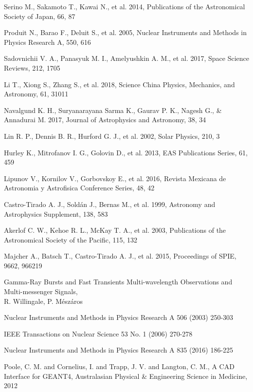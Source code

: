 \documentclass[12pt, a4paper,titlepage]{article}
\numberwithin{equation}{section}
\numberwithin{figure}{section}
\begin{document}
\begin{thebibliography}{99}
 Serino M., Sakamoto T., Kawai N., et al. 2014, Publications of the Astronomical Society of Japan, 66,
87

 Produit N., Barao F., Deluit S., et al. 2005, Nuclear Instruments and Methods in Physics Research A,
550, 616

 Sadovnichii V. A., Panasyuk M. I., Amelyushkin A. M., et al. 2017, Space Science Reviews, 212, 1705

 Li T., Xiong S., Zhang S., et al. 2018, Science China Physics, Mechanics, and Astronomy, 61, 31011

 Navalgund K. H., Suryanarayana Sarma K., Gaurav P. K., Nagesh G., \& Annadurai M. 2017, Journal of Astrophysics and Astronomy, 38, 34

 Lin R. P., Dennis B. R., Hurford G. J., et al. 2002, Solar Physics, 210, 3

 Hurley K., Mitrofanov I. G., Golovin D., et al. 2013, EAS Publications Series, 61, 459 

 Lipunov V., Kornilov V., Gorbovskoy E., et al. 2016, Revista Mexicana de Astronomia y Astrofisica
Conference Series, 48, 42

 Castro-Tirado A. J., Soldán J., Bernas M., et al. 1999, Astronomy and Astrophysics Supplement, 138, 583

 Akerlof C. W., Kehoe R. L., McKay T. A., et al. 2003, Publications of the Astronomical Society of the Pacific, 115, 132

 Majcher A., Batsch T., Castro-Tirado A. J., et al. 2015, Proceedings of SPIE, 9662, 966219

 Gamma-Ray Bursts and Fast Transients
Multi-wavelength Observations and Multi-messenger Signals,\\
R. Willingale, P. Mészáros

 Nuclear Instruments and Methods in Physics Research A 506 (2003) 250-303

 IEEE Transactions on Nuclear Science 53 No. 1 (2006) 270-278

 Nuclear Instruments and Methods in Physics Research A 835 (2016) 186-225

 Poole, C. M. and Cornelius, I. and Trapp, J. V. and Langton, C. M., A CAD Interface for GEANT4, Australasian Physical \& Engineering Science in Medicine, 2012


\end{thebibliography}
\end{document}
